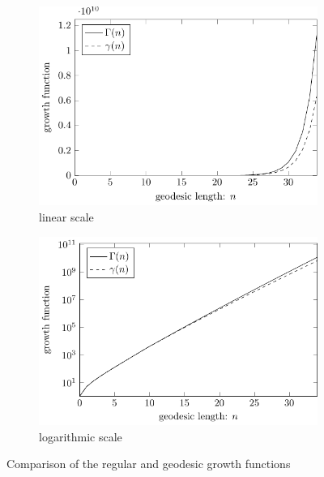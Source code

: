 \begin{figure}[!h]
	\centering
	
	\begin{subfigure}{0.48\linewidth}
		\centering
		\includegraphics[width=\linewidth]
			{figures/results/normalGrowth/usual/normalGrowth}
		\caption{linear scale}
		\label{fig:normalGrowth:linear}
	\end{subfigure}
	\hfill
	\begin{subfigure}{0.48\linewidth}
		\centering
		\includegraphics[width=\linewidth]
			{figures/results/normalGrowth/log/normalGrowthLog}
		\caption{logarithmic scale}
		\label{fig:normalGrowth:log}
	\end{subfigure}
	
	\caption{Comparison of the regular and geodesic growth functions}
	\label{fig:normalGrowth}
\end{figure}

